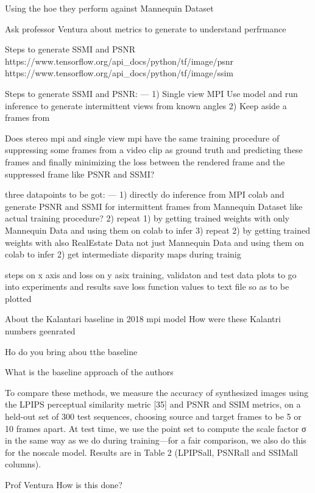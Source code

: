 





Using the 
hoe they perform against Mannequin Dataset 

Ask professor Ventura about metrics to generate to understand perfrmance 

Steps to generate SSMI and PSNR
\cite{wang_ssmi_psnr}
https://www.tensorflow.org/api_docs/python/tf/image/psnr
https://www.tensorflow.org/api_docs/python/tf/image/ssim

Steps to generate SSMI and PSNR: ---
1) Single view MPI Use model and run inference to generate intermittent views from known angles 
2) Keep aside a frames from 

Does stereo mpi and single view mpi have the same training procedure of suppressing some frames from a video clip as ground truth and predicting these frames and finally minimizing the loss between the rendered frame and the suppressed frame like PSNR and SSMI?

three datapoints to be got: ---
1) directly do inference from MPI colab and generate PSNR and SSMI for intermittent frames from Mannequin Dataset like actual training procedure?
2) repeat 1) by getting trained weights with only Mannequin Data and using them on colab to infer  
3) repeat 2) by getting trained weights with also RealEstate Data not just Mannequin Data and using them on colab to infer
2) get intermediate disparity maps during trainig 

steps on x axis and loss on y asix
training, validaton and test data plots to go into experiments and results
save loss function values to text file so as to be plotted

About the Kalantari baseline in 2018 mpi model
How were these Kalantri numbers geenrated

Ho do you bring abou tthe baseline 

What is the baseline approach of the authors 

To compare these methods, we measure the accuracy of
synthesized images using the LPIPS perceptual similarity
metric [35] and PSNR and SSIM metrics, on a held-out set
of 300 test sequences, choosing source and target frames
to be 5 or 10 frames apart. At test time, we use the point
set to compute the scale factor σ in the same way as we do
during training—for a fair comparison, we also do this for
the noscale model. Results are in Table 2 (LPIPSall, PSNRall
and SSIMall columns).

Prof Ventura How is this done?


